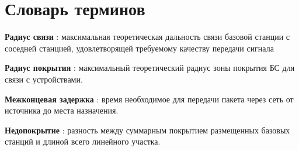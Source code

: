 \chapter*{Словарь терминов}             %


\textbf{Радиус связи} : максимальная теоретическая дальность связи базовой станции с соседней станцией, удовлетворящей требуемому качеству передачи сигнала

\textbf{Радиус покрытия} : максимальный теоретический радиус зоны покрытия БС для связи с устройствами.

\textbf{Межконцевая задержка} : время необходимое для передачи пакета через сеть от источника до места назначения.

\textbf{Недопокрытие} : разность между суммарным покрытием размещенных базовых станций и длиной всего линейного участка.


